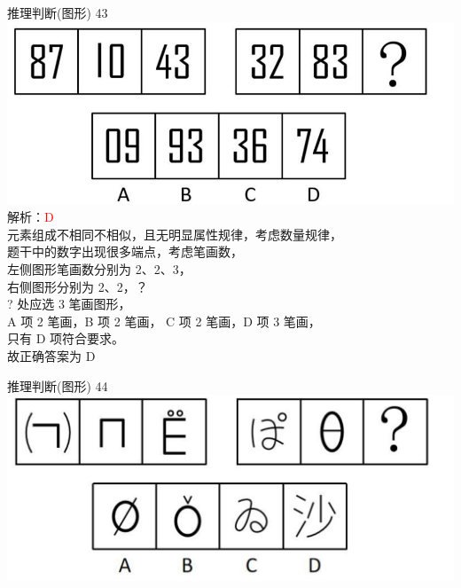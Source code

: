 \documentclass[aspectratio=169]{beamer}
\begin{document}
\begin{frame}[t]{推理判断(图形)}
    43\\
    \includegraphics[scale=0.25]{43}\\ 
    解析：\textcolor{red}{D}\\
    元素组成不相同不相似，且无明显属性规律，考虑数量规律，\\
    题干中的数字出现很多端点，考虑笔画数，\\
    左侧图形笔画数分别为 2、2、3，\\
    右侧图形分别为 2、2，？\\
    ? 处应选 3 笔画图形，\\
    A 项 2 笔画，B 项 2 笔画，
    C 项 2 笔画，D 项 3 笔画，\\
    只有 D 项符合要求。\\
    故正确答案为 D\\
\end{frame}


\begin{frame}[t]{推理判断(图形)}
    44\\
    \includegraphics[scale=0.25]{44}\\ 
\end{frame}
\end{document}
